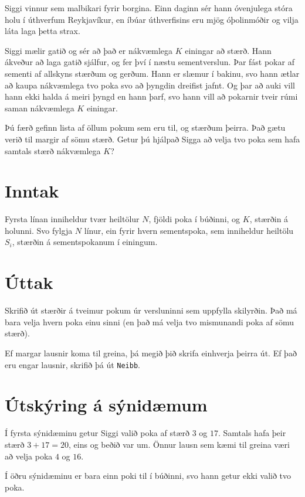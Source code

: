 

Siggi vinnur sem malbikari fyrir borgina. Einn daginn sér hann óvenjulega stóra holu í úthverfum Reykjavíkur, en íbúar úthverfisins eru mjög óþolinmóðir og vilja láta laga þetta strax.

Siggi mælir gatið og sér að það er nákvæmlega $K$ einingar að stærð. Hann
ákveður að laga gatið sjálfur, og fer því í næstu sementverslun. Þar fást pokar
af sementi af allskyns stærðum og gerðum. Hann er slæmur í bakinu, svo hann
ætlar að kaupa nákvæmlega tvo poka svo að þyngdin dreifist jafnt. Og þar að
auki vill hann ekki halda á meiri þyngd en hann þarf, svo hann vill að pokarnir
tveir rúmi saman nákvæmlega $K$ einingar.

Þú færð gefinn lista af öllum pokum sem eru til, og stærðum þeirra. Það gætu
verið til margir af sömu stærð. Getur þú hjálpað Sigga að velja tvo poka
sem hafa samtals stærð nákvæmlega $K$?

\section*{Inntak}
Fyrsta línan inniheldur tvær heiltölur $N$, fjöldi poka í búðinni, og $K$, stærðin
á holunni. Svo fylgja $N$ línur, ein fyrir hvern sementspoka, sem inniheldur
heiltölu $S_i$, stærðin á sementspokanum í einingum.

\section*{Úttak}
Skrifið út stærðir á tveimur pokum úr versluninni sem uppfylla skilyrðin. Það
má bara velja hvern poka einu sinni (en það má velja tvo mismunandi poka af
sömu stærð).

Ef margar lausnir koma til greina, þá megið þið skrifa einhverja þeirra út.
Ef það eru engar lausnir, skrifið þá út \texttt{Neibb}.

\section*{Útskýring á sýnidæmum}
Í fyrsta sýnidæminu getur Siggi valið poka af stærð $3$ og $17$. Samtals hafa
þeir stærð $3+17=20$, eins og beðið var um. Önnur lausn sem kæmi til greina
væri að velja poka $4$ og $16$.

Í öðru sýnidæminu er bara einn poki til í búðinni, svo hann getur ekki valið
tvo poka.


